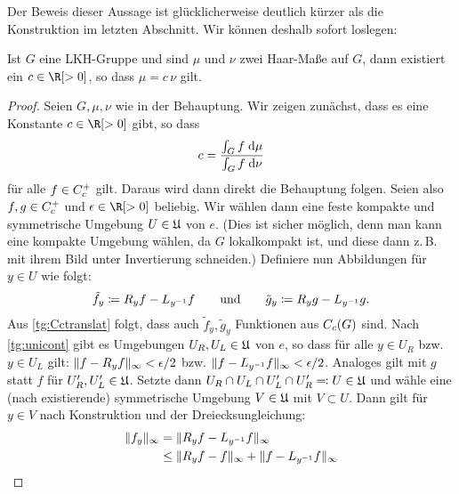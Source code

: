 
\bigskip
\noindent
Der Beweis dieser Aussage ist glücklicherweise deutlich kürzer als die
Konstruktion im letzten Abschnitt. Wir können deshalb sofort loslegen: 

\begin{thSatz}
    \label{pf:uniqueness}
    Ist $G$ eine LKH-Gruppe und sind $\mu$ und $\nu$ zwei Haar-Maße auf $G$,
    dann existiert ein $c\in\R[>0]$, so dass $\mu = c\,\nu$ gilt.
\end{thSatz}

\begin{proof}
    Seien $G,\mu,\nu$ wie in der Behauptung. Wir zeigen zunächst, dass es eine
    Konstante $c\in\R[>0]$ gibt, so dass
    \[ c = \frac{\int_G f \;\mathrm{d} \mu}{\int_G f \;\mathrm{d} \nu} \]
    für alle $f\in C_c^+$ gilt. Daraus wird dann direkt die Behauptung
    folgen. Seien also $f,g\in C_c^+$ und $\epsilon\in\R[>0]$
    beliebig. Wir wählen dann eine feste kompakte und symmetrische Umgebung
    $U\in\mathfrak{U}$ von $e$. (Dies ist sicher möglich, denn man kann eine
    kompakte Umgebung wählen, da $G$ lokalkompakt ist, und diese dann z.\,B. mit
    ihrem Bild unter Invertierung schneiden.) 
    Definiere nun Abbildungen für $y\in U$ wie folgt:
    \[  \tilde f_y \coloneqq R_yf - L_{y^{-1}}f
        \qquad\text{und}\qquad
        \tilde g_y \coloneqq R_yg - L_{y^{-1}}g
    . \]
    Aus \cref{tg:Cctranslat} folgt, dass auch $\tilde f_y,\tilde g_y$ Funktionen
    aus $C_c(G)$ sind. Nach \cref{tg:unicont} gibt es Umgebungen
    $U_R,U_L\in\mathfrak{U}$ von $e$, so dass für alle $y\in U_R$ bzw. $y\in U_L$
    gilt: 
    $\lVert f-R_yf\rVert_\infty<\epsilon/2$ bzw. $\lVert f-L_{y^{-1}}f\rVert_\infty<\epsilon/2$.
    Analoges gilt mit $g$ statt $f$ für $U_R',U_L'\in\mathfrak{U}$.
    Setzte dann $U_R\cap U_L\cap U_L'\cap U_R' \eqqcolon U \in\mathfrak{U}$
    und wähle eine (nach  existierende) symmetrische
    Umgebung $V\in\mathfrak{U}$ mit $V\subset U$. Dann gilt für $y\in V$ nach
    Konstruktion und der Dreiecksungleichung:
    \begin{align*}
        \supnorm{ f_y }                                                 %
        &=    \supnorm{ R_yf - L_{y^{-1}}f }                            \\
        &\leq \supnorm{ R_yf - f } + \supnorm{ f - L_{y^{-1}}f }        \\

\end{align*}
\end{proof}
